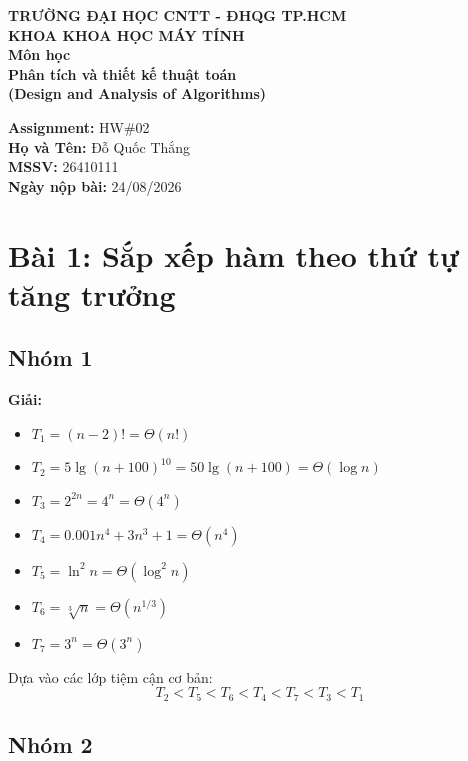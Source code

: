 \documentclass[12pt,a4paper]{article}
\begin{document}
\begin{center}
    \textbf{TRƯỜNG ĐẠI HỌC CNTT - ĐHQG TP.HCM} \\
    \textbf{KHOA KHOA HỌC MÁY TÍNH} \\
    \vspace{1.5cm}
    \textbf{Môn học} \\
    \textbf{Phân tích và thiết kế thuật toán} \\
    \textbf{(Design and Analysis of Algorithms)} \\
\end{center}

\vfill
\noindent
\textbf{Assignment:} HW\#02 \\
\textbf{Họ và Tên:} Đỗ Quốc Thắng \\
\textbf{MSSV:} 26410111 \\
\textbf{Ngày nộp bài:} 24/08/2026

\newpage

\section*{Bài 1: Sắp xếp hàm theo thứ tự tăng trưởng}

\subsection*{Nhóm 1}

\textbf{Giải:}
\begin{itemize}
    \item $T_1 = (n - 2)! = \Theta(n!)$
    \item $T_2 = 5 \lg(n + 100)^{10} = 50 \lg(n + 100) = \Theta(\log n)$
    \item $T_3 = 2^{2n} = 4^n = \Theta(4^n)$
    \item $T_4 = 0.001n^4 + 3n^3 + 1 = \Theta(n^4)$
    \item $T_5 = \ln^2 n = \Theta(\log^2 n)$
    \item $T_6 = \sqrt[3]{n} = \Theta(n^{1/3})$
    \item $T_7 = 3^n = \Theta(3^n)$
\end{itemize}

Dựa vào các lớp tiệm cận cơ bản:
$$ T_2 < T_5 < T_6 < T_4 < T_7 < T_3 < T_1 $$


\subsection*{Nhóm 2}
\end{document}
